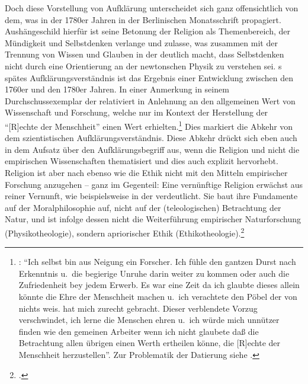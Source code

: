 Doch diese  Vorstellung von Aufklärung unterscheidet
sich ganz offensichtlich von dem, was  in der 1780er Jahren
in der Berlinischen Monatsschrift propagiert. Aushängeschild hierfür
ist seine Betonung der Religion als Themenbereich, der Mündigkeit und
Selbstdenken verlange und zulasse, was zusammen mit der Trennung von Wissen und
Glauben in der  deutlich macht, dass
Selbstdenken nicht durch eine Orientierung an der
newtonschen Physik zu verstehen sei. s spätes
Aufklärungsverständnis ist das Ergebnis einer Entwicklung zwischen den 1760er
und den 1780er Jahren. In einer Anmerkung in seinem Durchschussexemplar der
 relativiert  in
Anlehnung an  den allgemeinen Wert von Wissenschaft und
Forschung, welche nur im Kontext der Herstellung der \enquote{[R]echte der
Menschheit} einen Wert
erhielten.\footnote{\label{Anmerkung:Rousseauhatmichzurechtgebracht}\cite[Vgl.][XX:
44.8-16]{Kant:GesammelteWerke1900ff.}: \enquote{Ich selbst bin aus Neigung ein
Forscher. Ich fühle den gantzen Durst nach Erkenntnis u.\ die begierige Unruhe
darin weiter zu kommen oder auch die Zufriedenheit bey jedem Erwerb. Es war eine
Zeit da ich glaubte dieses allein könnte die Ehre der Menschheit machen u.\ ich
verachtete den Pöbel der von nichts weis.  hat mich zurecht
gebracht. Dieser verblendete Vorzug verschwindet, ich lerne die Menschen ehren
u.\ ich würde mich unnützer finden wie den gemeinen Arbeiter wenn ich nicht
glaubete daß die Betrachtung allen übrigen einen Werth ertheilen könne, die
[R]echte der Menschheit herzustellen}. Zur Problematik der Datierung siehe
\cite[][67--71]{Schwaiger:KategorischeundandereImperative1999}.} Dies markiert
die Abkehr von dem szientistischen
Aufklärungsverständnis.  Diese Abkehr
drückt sich eben auch in dem Aufsatz über den Aufklärungsbegriff aus, wenn
 die Religion und nicht die empirischen Wissenschaften
thematisiert und dies auch explizit hervorhebt. Religion ist aber nach
 ebenso wie die Ethik nicht mit den Mitteln empirischer
Forschung anzugehen -- ganz im Gegenteil: Eine vernünftige Religion erwächst aus
reiner Vernunft, wie  beispielsweise in der  verdeutlicht. Sie baut ihre Fundamente auf der
Moralphilosophie auf, nicht auf der (teleologischen) Betrachtung der Natur, und
ist infolge dessen nicht die Weiterführung empirischer Naturforschung
(Physikotheologie), sondern apriorischer Ethik
(Ethikotheologie).\footnote{\cite[Vgl.][\S~85\,f.,]{Kant:KritikderUrteilskraft2009}
\cite[V: 436.3--447.13]{Kant:GesammelteWerke1900ff.}.}

